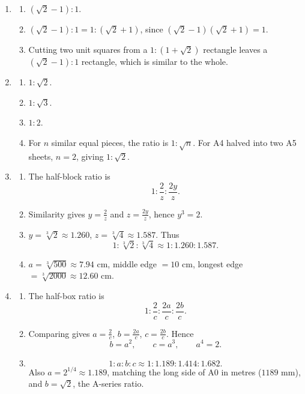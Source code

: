 \documentclass[11pt,a4paper]{article}
\begin{document}
\begin{enumerate}[label=\textbf{Q\arabic*.}, leftmargin=*, itemsep=0.8em]
\item
\begin{enumerate}[label=(\alph*)]
\item \((\sqrt2-1):1\).
\item \((\sqrt2-1):1=1:(\sqrt2+1)\), since \((\sqrt2-1)(\sqrt2+1)=1\).
\item Cutting two unit squares from a \(1:(1+\sqrt2)\) rectangle leaves a \((\sqrt2-1):1\) rectangle, which is similar to the whole.
\end{enumerate}

\item
\begin{enumerate}[label=(\alph*)]
\item \(1:\sqrt2\).
\item \(1:\sqrt3\).
\item \(1:2\).
\item For \(n\) similar equal pieces, the ratio is \(1:\sqrt n\). For A4 halved into two A5 sheets, \(n=2\), giving \(1:\sqrt2\).
\end{enumerate}

\item
\begin{enumerate}[label=(\alph*)]
\item The half-block ratio is
\[
1:\frac2z:\frac{2y}{z}.
\]
\item Similarity gives \(y=\frac2z\) and \(z=\frac{2y}{z}\), hence \(y^3=2\).
\item \(y=\sqrt[3]{2}\approx1.260\), \quad \(z=\sqrt[3]{4}\approx1.587\). Thus
\[
1:\sqrt[3]{2}:\sqrt[3]{4}\approx1:1.260:1.587.
\]
\item \(a=\sqrt[3]{500}\approx7.94\text{ cm}\), \quad middle edge \(=10\text{ cm}\), \quad longest edge \(=\sqrt[3]{2000}\approx12.60\text{ cm}\).
\end{enumerate}

\item
\begin{enumerate}[label=(\alph*)]
\item The half-box ratio is
\[
1:\frac2c:\frac{2a}{c}:\frac{2b}{c}.
\]
\item Comparing gives \(a=\frac2c\), \(b=\frac{2a}{c}\), \(c=\frac{2b}{c}\). Hence
\[
b=a^2,\qquad c=a^3,\qquad a^4=2.
\]
\item
\[
1:a:b:c\approx1:1.189:1.414:1.682.
\]
Also \(a=2^{1/4}\approx1.189\), matching the long side of A0 in metres (\(1189\) mm), and \(b=\sqrt2\), the A-series ratio.
\end{enumerate}


\end{enumerate}
\end{document}
